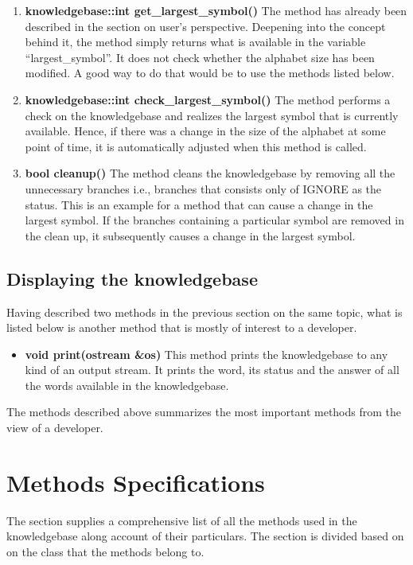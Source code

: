 \begin{enumerate}
\item \textbf{knowledgebase::int get\_largest\_symbol()} \vskip 1pt
The method has already been described in the section on user's perspective. Deepening into the concept behind it, the method simply returns what is available in the variable ``largest\_symbol''. It does not check whether the alphabet size has been modified. A good way to do that would be to use the methods listed below.
	
\item \textbf{knowledgebase::int check\_largest\_symbol()} \hfill \vskip 1pt
The method performs a check on the knowledgebase and realizes the largest symbol that is currently available. Hence, if there was a change in the size of the alphabet at some point of time, it is automatically adjusted when this method is called.
	
\item \textbf{bool cleanup()} \hfill \vskip 1pt
The method cleans the knowledgebase by removing all the unnecessary branches i.e., branches that consists only of IGNORE as the status. This is an example for a method that can cause a change in the largest symbol. If the branches containing a particular symbol are removed in the clean up, it subsequently causes a change in the largest symbol. 
\end{enumerate}

\subsection*{Displaying the knowledgebase}
Having described two methods in the previous section on the same topic, what is listed below is another method that is mostly of interest to a developer. 
\begin{itemize}
 \item \textbf{void print(ostream \&os)} \vskip 1pt
  This method prints the knowledgebase to any kind of an output stream. It prints the word, its status and the answer of all the words available in the knowledgebase.
\end{itemize}

\vskip 1pt
The methods described above summarizes the most important methods from the view of a developer.
	
\section{Methods Specifications}
The section supplies a comprehensive list of all the methods used in the knowledgebase along account of their particulars. The section is divided based on on the class that the methods belong to.
